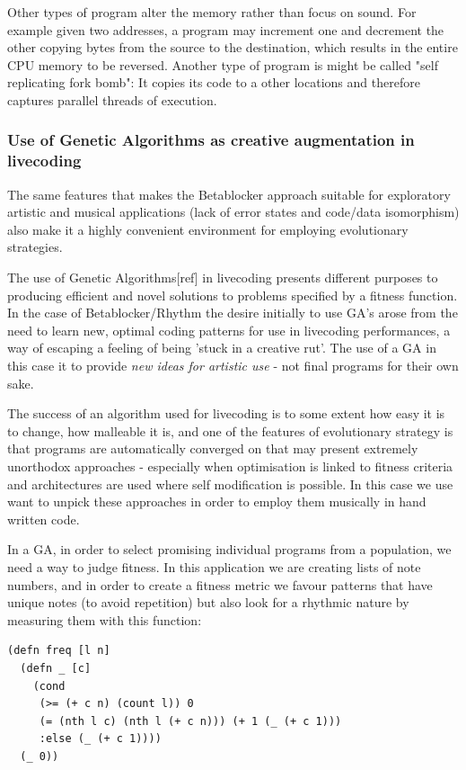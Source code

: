 \documentclass[letterpaper, 12pt]{article}
\begin{document}
Other types of program alter the memory rather than focus on sound. 
For example given two addresses, a program may increment one and decrement the other copying bytes from the source to the destination, which results in the entire CPU memory to be reversed. 
Another type of program is might be called "self replicating fork bomb": It copies its code to a other locations and therefore captures parallel threads of execution.


\subsubsection{Use of Genetic Algorithms as creative augmentation in livecoding} %
\label{sub:genetic_programming}

The same features that makes the Betablocker approach suitable for exploratory artistic and musical applications (lack of error states and code/data isomorphism) also make it a highly convenient environment for employing evolutionary strategies.

The use of Genetic Algorithms[ref] in livecoding presents different purposes to producing efficient and novel solutions to problems specified by a fitness function. In the case of Betablocker/Rhythm the desire initially to use GA's arose from the need to learn new, optimal coding patterns for use in livecoding performances, a way of escaping a feeling of being 'stuck in a creative rut'. The use of a GA in this case it to provide \emph{new ideas for artistic use} - not final programs for their own sake.

The success of an algorithm used for livecoding is to some extent how easy it is to change, how malleable it is, and one of the features of evolutionary strategy is that programs are automatically converged on that may present extremely unorthodox approaches - especially when optimisation is linked to fitness criteria and architectures are used where self modification is possible. In this case we use want to unpick these approaches in order to employ them musically in hand written code.

In a GA, in order to select promising individual programs from a population, we need a way to judge fitness. In this application we are creating lists of note numbers, and in order to create a fitness metric we favour patterns that have unique notes (to avoid repetition) but also look for a rhythmic nature by measuring them with this function:

\begin{Verbatim}[fontfamily=courier, xleftmargin=\parindent]
(defn freq [l n]
  (defn _ [c]
    (cond
     (>= (+ c n) (count l)) 0
     (= (nth l c) (nth l (+ c n))) (+ 1 (_ (+ c 1)))
     :else (_ (+ c 1))))
  (_ 0))
\end{Verbatim}
\end{document}
